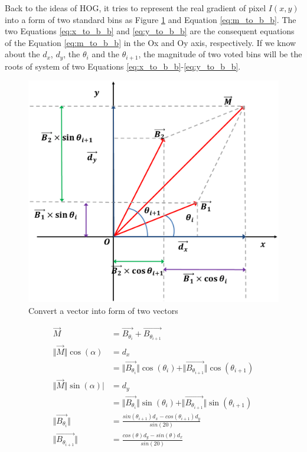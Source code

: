 Back to the ideas of HOG, it tries to represent the real gradient of pixel $I(x,y)$ into
a form of two standard bins as Figure \ref{fig:M_Oxy} and  Equation \ref{eq:m_to_b_b}.
The two Equations \ref{eq:x_to_b_b} and \ref{eq:y_to_b_b} are the consequent
equations of the Equation \ref{eq:m_to_b_b} in the Ox and Oy axis, respectively.
If we know about the $d_x$, $d_y$, the $\theta_i$ and the $\theta_{i + 1}$, the
magnitude of two voted bins will be the roots of system of two Equations
\ref{eq:x_to_b_b}-\ref{eq:y_to_b_b}.

\begin{figure}[t]
	\def\sscale{1.0\linewidth}
	\includegraphics[width=\sscale]{"imgs/M_Oxy"}
	\caption{Convert a vector into form of two vectors}
	\label{fig:M_Oxy}
\end{figure}

\begin{align}
	\overrightarrow{M} &= \overrightarrow{B_{\theta_i}} + \overrightarrow{B_{\theta_{i + 1}}}  \label{eq:m_to_b_b}	 \\
	\Vert\overrightarrow{M}\Vert \cos(\alpha)
	&=  d_x \nonumber \\
	&= \Vert \overrightarrow{B_{\theta_i}} \Vert \cos(\theta_i)
	+  \Vert \overrightarrow{B_{\theta_{i+1}}} \Vert \cos(\theta_{i+1}) \label{eq:x_to_b_b}	 \\
	\Vert\overrightarrow{M}\Vert \sin(\alpha) \vert
	&= d_y \nonumber \\
	&= \Vert \overrightarrow{B_{\theta_i}} \Vert \sin(\theta_i)
	+  \Vert \overrightarrow{B_{\theta_{i+1}}} \Vert \sin(\theta_{i+1}) \label{eq:y_to_b_b}\\
	\Vert \overrightarrow{B_{\theta_i}} \Vert &= \frac{sin(\theta_{i+1})d_x - cos(\theta_{i+1})d_y }{sin(20)} \label{eq:b1} \\
	\Vert \overrightarrow{B_{\theta_{i+1}}} \Vert &= \frac{cos(\theta)d_y - sin(\theta)d_x}{sin(20)} \label{eq:b2}
\end{align}



